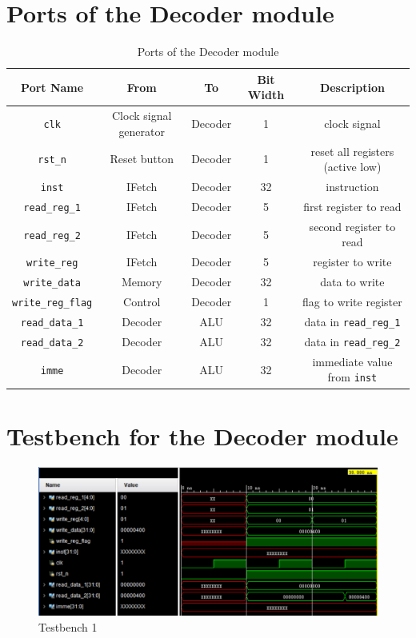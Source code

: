 \documentclass[a4paper,12pt]{article}
\begin{document}
\section{Ports of the Decoder module}

\begin{table}[H]
	\begin{center}
		\begin{tabular}{ccccc}
			\toprule
			Port Name & From & To & Bit Width & Description \\
			\midrule
			\texttt{clk} & Clock signal generator & Decoder & 1 & clock signal \\
			\texttt{rst\_n} & Reset button & Decoder & 1 & reset all registers (active low) \\
			\texttt{inst} & IFetch & Decoder & 32 & instruction \\
			\texttt{read\_reg\_1} & IFetch & Decoder & 5 & first register to read \\
			\texttt{read\_reg\_2} & IFetch & Decoder & 5 & second register to read \\
			\texttt{write\_reg} & IFetch & Decoder & 5 & register to write \\
			\texttt{write\_data} & Memory & Decoder & 32 & data to write \\
			\texttt{write\_reg\_flag} & Control & Decoder & 1 & flag to write register \\
			\hline
			\texttt{read\_data\_1} & Decoder & ALU & 32 & data in \texttt{read\_reg\_1} \\
			\texttt{read\_data\_2} & Decoder & ALU & 32 & data in \texttt{read\_reg\_2} \\
			\texttt{imme} & Decoder & ALU & 32 & immediate value from \texttt{inst} \\
			\bottomrule
			
		\end{tabular}
	\end{center}
	\caption{Ports of the Decoder module}
\end{table}

\section{Testbench for the Decoder module}

\begin{figure}[H]
	\centering
	\includegraphics[width=\textwidth]{decoder1.png}
	\caption{Testbench 1}
\end{figure}
\end{document}
